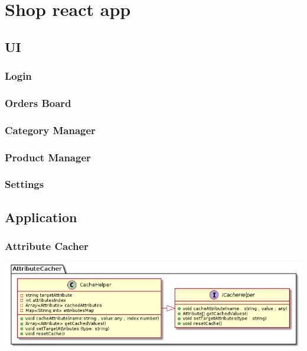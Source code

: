 \documentclass{article}
\begin{document}
\section{Shop react app}

\subsection{UI}

\subsubsection{Login}

\subsubsection{Orders Board}

\subsubsection{Category Manager}

\subsubsection{Product Manager}

\subsubsection{Settings}



\subsection{Application}
\subsubsection{Attribute Cacher}

\includegraphics[scale=0.5]{./out/ReactApp/Application/AttributeCacher/AttributeCacher.png}\\
\end{document}
